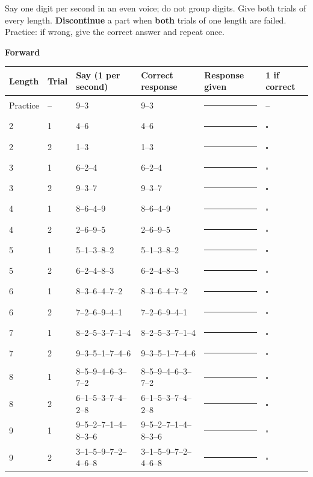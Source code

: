 \documentclass[10pt,a4paper]{article}
\newcommand{\blank}[1][1.2cm]{\rule{#1}{0.4pt}}
\newcommand{\bx}{$\square$}
\begin{document}
Say one digit per second in an even voice; do not group digits. Give both trials of every length. \textbf{Discontinue} a part when \textbf{both} trials of one length are failed. Practice: if wrong, give the correct answer and repeat once.
\par{}\medskip\textbf{Forward}\par\begin{longtable}{@{}llp{4.2cm}p{4.2cm}p{3.4cm}l@{}}\toprule Length & Trial & Say (1 per second) & Correct response & Response given & 1 if correct\\ \midrule\endhead
Practice & -- & 9--3 & 9--3 & \blank[3.2cm] & --\\ \midrule
2 & 1 & 4--6 & 4--6 & \blank[3.2cm] & \bx\\
2 & 2 & 1--3 & 1--3 & \blank[3.2cm] & \bx\\\midrule
3 & 1 & 6--2--4 & 6--2--4 & \blank[3.2cm] & \bx\\
3 & 2 & 9--3--7 & 9--3--7 & \blank[3.2cm] & \bx\\\midrule
4 & 1 & 8--6--4--9 & 8--6--4--9 & \blank[3.2cm] & \bx\\
4 & 2 & 2--6--9--5 & 2--6--9--5 & \blank[3.2cm] & \bx\\\midrule
5 & 1 & 5--1--3--8--2 & 5--1--3--8--2 & \blank[3.2cm] & \bx\\
5 & 2 & 6--2--4--8--3 & 6--2--4--8--3 & \blank[3.2cm] & \bx\\\midrule
6 & 1 & 8--3--6--4--7--2 & 8--3--6--4--7--2 & \blank[3.2cm] & \bx\\
6 & 2 & 7--2--6--9--4--1 & 7--2--6--9--4--1 & \blank[3.2cm] & \bx\\\midrule
7 & 1 & 8--2--5--3--7--1--4 & 8--2--5--3--7--1--4 & \blank[3.2cm] & \bx\\
7 & 2 & 9--3--5--1--7--4--6 & 9--3--5--1--7--4--6 & \blank[3.2cm] & \bx\\\midrule
8 & 1 & 8--5--9--4--6--3--7--2 & 8--5--9--4--6--3--7--2 & \blank[3.2cm] & \bx\\
8 & 2 & 6--1--5--3--7--4--2--8 & 6--1--5--3--7--4--2--8 & \blank[3.2cm] & \bx\\\midrule
9 & 1 & 9--5--2--7--1--4--8--3--6 & 9--5--2--7--1--4--8--3--6 & \blank[3.2cm] & \bx\\
9 & 2 & 3--1--5--9--7--2--4--6--8 & 3--1--5--9--7--2--4--6--8 & \blank[3.2cm] & \bx\\\midrule
\bottomrule\end{longtable}
\end{document}
